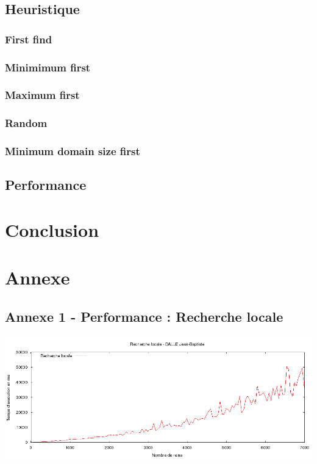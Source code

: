 \documentclass[a4paper,10pt]{article}
\begin{document}
\subsection{Heuristique}

\subsubsection{First find}

\subsubsection{Minimimum first}

\subsubsection{Maximum first}

\subsubsection{Random}

\subsubsection{Minimum domain size first}

\subsection{Performance}

\section{Conclusion}

\section{Annexe}

\subsection{Annexe 1 - Performance : Recherche locale}
\includegraphics[width=1\textwidth]{Recherche_Locale.png}
\end{document}
